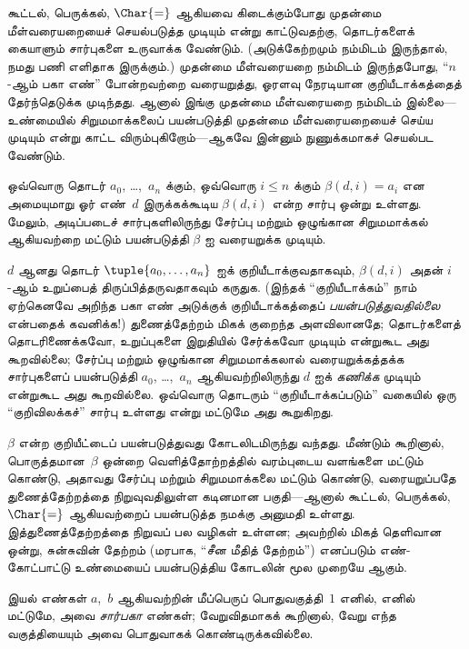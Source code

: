 \documentclass[../../../include/open-logic-section]{subfiles}
\begin{document}



கூட்டல், பெருக்கல், $\Char{=}$ ஆகியவை கிடைக்கும்போது முதன்மை
மீள்வரையறையைச் செயல்படுத்த முடியும் என்று காட்டுவதற்கு, தொடர்களைக் கையாளும்
சார்புகளை உருவாக்க வேண்டும். (அடுக்கேற்றமும் நம்மிடம் இருந்தால், நமது பணி
எளிதாக இருக்கும்.) முதன்மை மீள்வரையறை நம்மிடம் இருந்தபோது, ``$n$-ஆம்
பகா எண்'' போன்றவற்றை வரையறுத்து, ஓரளவு நேரடியான குறியீடாக்கத்தைத்
தேர்ந்தெடுக்க முடிந்தது. ஆனால் இங்கு முதன்மை மீள்வரையறை நம்மிடம்
இல்லை---உண்மையில் சிறுமமாக்கலைப் பயன்படுத்தி முதன்மை மீள்வரையறையைச் செய்ய
முடியும் என்று காட்ட விரும்புகிறோம்---ஆகவே இன்னும் நுணுக்கமாகச் செயல்பட
வேண்டும்.

\begin{lem}
ஒவ்வொரு தொடர் $a_0$, \dots,~$a_n$ க்கும், ஒவ்வொரு $i \le n$ க்கும்
$\beta(d,i) = a_i$ என அமையுமாறு ஓர் எண்~$d$ இருக்கக்கூடிய
$\beta(d,i)$ என்ற சார்பு ஒன்று உள்ளது. மேலும், அடிப்படைச் சார்புகளிலிருந்து
சேர்ப்பு மற்றும் ஒழுங்கான சிறுமமாக்கல் ஆகியவற்றை மட்டும் பயன்படுத்தி
$\beta$ ஐ வரையறுக்க முடியும்.
\end{lem}

$d$ ஆனது தொடர் $\tuple{a_0, \dots, a_n}$ ஐக் குறியீடாக்குவதாகவும்,
$\beta(d,i)$ அதன் $i$-ஆம் உறுப்பைத் திருப்பித்தருவதாகவும் கருதுக.
(இந்தக் ``குறியீடாக்கம்'' நாம் ஏற்கெனவே அறிந்த பகா எண் அடுக்குக்
குறியீடாக்கத்தைப் \emph{பயன்படுத்துவதில்லை} என்பதைக் கவனிக்க!) துணைத்தேற்றம்
மிகக் குறைந்த அளவிலானதே; தொடர்களைத் தொடரிணைக்கவோ, உறுப்புகளை இறுதியில்
சேர்க்கவோ முடியும் என்றுகூட அது கூறவில்லை; சேர்ப்பு மற்றும் ஒழுங்கான
சிறுமமாக்கலால் வரையறுக்கத்தக்க சார்புகளைப் பயன்படுத்தி $a_0$, \dots,~$a_n$
ஆகியவற்றிலிருந்து $d$ ஐக் \emph{கணிக்க} முடியும் என்றுகூட அது கூறவில்லை.
ஒவ்வொரு தொடரும் ``குறியீடாக்கப்படும்'' வகையில் ஒரு ``குறிவிலக்கச்'' சார்பு
உள்ளது என்று மட்டுமே அது கூறுகிறது.

$\beta$ என்ற குறியீட்டைப் பயன்படுத்துவது கோடலிடமிருந்து வந்தது. மீண்டும்
கூறினால், பொருத்தமான~$\beta$ ஒன்றை வெளித்தோற்றத்தில் வரம்புடைய வளங்களை
மட்டும் கொண்டு, அதாவது சேர்ப்பு மற்றும் சிறுமமாக்கலை மட்டும் கொண்டு,
வரையறுப்பதே துணைத்தேற்றத்தை நிறுவுவதிலுள்ள கடினமான பகுதி---ஆனால் கூட்டல்,
பெருக்கல், $\Char{=}$ ஆகியவற்றைப் பயன்படுத்த நமக்கு அனுமதி உள்ளது.
இத்துணைத்தேற்றத்தை நிறுவப் பல வழிகள் உள்ளன; அவற்றில் மிகத் தெளிவான
ஒன்று, சுன்சுவின் தேற்றம் (மரபாக, ``சீன மீதித் தேற்றம்'') எனப்படும்
எண்-கோட்பாட்டு உண்மையைப் பயன்படுத்திய கோடலின் மூல முறையே ஆகும்.

\begin{defn}
இயல் எண்கள் $a$,~$b$ ஆகியவற்றின் மீப்பெருப் பொதுவகுத்தி~$1$ எனில்,
எனில் மட்டுமே, அவை \emph{சார்பகா} எண்கள்; வேறுவிதமாகக் கூறினால்,
வேறு எந்த வகுத்தியையும் அவை பொதுவாகக் கொண்டிருக்கவில்லை.
\end{defn}
\end{document}
